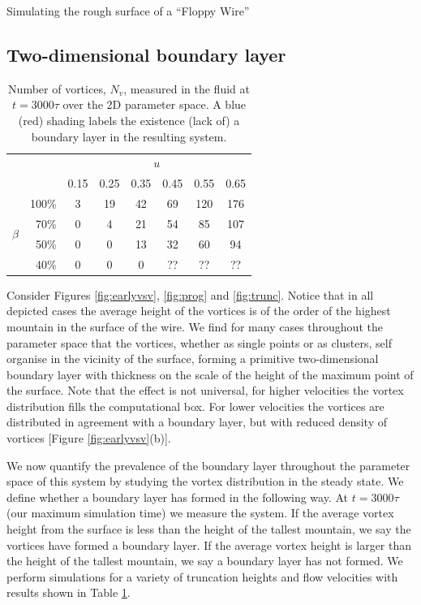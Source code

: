 \begin{chapter}{\label{cha:afm}Simulating the rough surface of a ``Floppy Wire''}
\subsection{Two-dimensional boundary layer}
\begin{table}
\centering
\begin{tabular}{cr|cccccc}
   & & \multicolumn{6}{c}{$u$}\\
   & & 0.15 & 0.25 & 0.35 & 0.45 & 0.55 & 0.65 \\
   \hline
  \multirow{4}{*}{$\beta$} & 100\% & \cellcolor{blue!50}3 & \cellcolor{blue!50}19 & \cellcolor{blue!50}42 & \cellcolor{red!50}69 & \cellcolor{red!50}120 & \cellcolor{red!50}176 \\
   &70\%& 0 & \cellcolor{blue!50}4 &  \cellcolor{blue!50}21 & \cellcolor{red!50}54 & \cellcolor{red!50}85 & \cellcolor{red!50}107 \\
   &50\%& 0 & 0 &  \cellcolor{blue!50}13 & \cellcolor{blue!50}32 & \cellcolor{red!50}60 & \cellcolor{red!50}94 \\
   &40\%& 0 & 0 &   0 & \cellcolor{blue!50}?? & ?? & ?? \\
\end{tabular}
\caption{\label{tbl:nv_bl}Number of vortices, $N_v$, measured in the fluid at $t=3000\tau$ over the 2D parameter space. A blue (red) shading labels the existence (lack of) a boundary layer in the resulting system.}
\end{table}

Consider Figures \ref{fig:earlyvsv}, \ref{fig:prog} and \ref{fig:trunc}. Notice that in all depicted cases the average height of the vortices is of the order of the highest mountain in the surface of the wire. We find for many cases throughout the parameter space that the vortices, whether as single points or as clusters, self organise in the vicinity of the surface, forming a primitive two-dimensional boundary layer with thickness on the scale of the height of the maximum point of the surface. Note that the effect is not universal, for higher velocities the vortex distribution fills the computational box. For lower velocities the vortices are distributed in agreement with a boundary layer, but with reduced density of vortices [Figure \ref{fig:earlyvsv}(b)].

We now quantify the prevalence of the boundary layer throughout the parameter space of this system by studying the vortex distribution in the steady state. We define whether a boundary layer has formed in the following way. At $t=3000\tau$ (our maximum simulation time) we measure the system. If the average vortex height from the surface is less than the height of the tallest mountain, we say the vortices have formed a boundary layer. If the average vortex height is larger than the height of the tallest mountain, we say a boundary layer has not formed. We perform simulations for a variety of truncation heights and flow velocities with results shown in Table \ref{tbl:nv_bl}.


\end{chapter}
